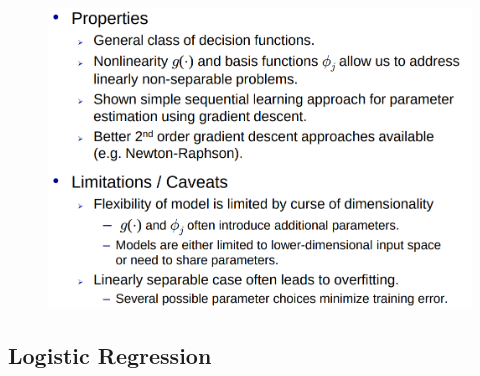 \documentclass{article}
\begin{document}
\begin{figure}[H]
  \centering
  \includegraphics[width=.5\textwidth]{generalized_linear_discriminants_summary}
\end{figure}

\subsection{Logistic Regression}
\end{document}

